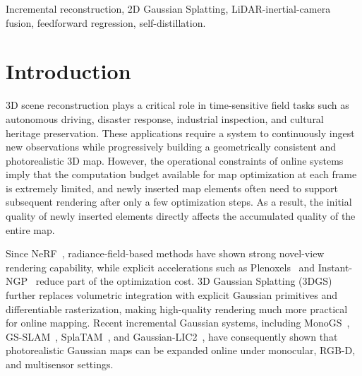\documentclass[lettersize,journal]{IEEEtran}
\begin{document}
\begin{IEEEkeywords}
Incremental reconstruction, 2D Gaussian Splatting, LiDAR-inertial-camera fusion, feedforward regression, self-distillation.
\end{IEEEkeywords}

\section{Introduction}
 3D scene reconstruction plays a critical role in time-sensitive field tasks such as autonomous driving, disaster response, industrial inspection, and cultural heritage preservation. These applications require a system to continuously ingest new observations while progressively building a geometrically consistent and photorealistic 3D map. However, the operational constraints of online systems imply that the computation budget available for map optimization at each frame is extremely limited, and newly inserted map elements often need to support subsequent rendering after only a few optimization steps. As a result, the initial quality of newly inserted elements directly affects the accumulated quality of the entire map.

Since NeRF~\cite{mildenhall2021nerf}, radiance-field-based methods have shown strong novel-view rendering capability, while explicit accelerations such as Plenoxels~\cite{fridovich2022plenoxels} and Instant-NGP~\cite{muller2022instant} reduce part of the optimization cost. 3D Gaussian Splatting (3DGS)~\cite{kerbl20233d} further replaces volumetric integration with explicit Gaussian primitives and differentiable rasterization, making high-quality rendering much more practical for online mapping. Recent incremental Gaussian systems, including MonoGS~\cite{matsuki2024gaussian}, GS-SLAM~\cite{yan2024gs}, SplaTAM~\cite{keetha2024splatam}, and Gaussian-LIC2~\cite{lang2025gaussianlic2}, have consequently shown that photorealistic Gaussian maps can be expanded online under monocular, RGB-D, and multisensor settings.
\end{document}
